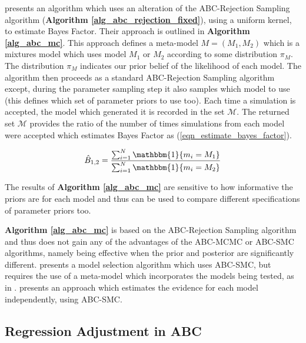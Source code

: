 \documentclass[11pt,a4paper]{article}
\theoremstyle{break}
\begin{document}
  \par \cite[]{abc_likelihood_free_methods_for_model_choice_in_gibbs_random_fields} presents an algorithm which uses an alteration of the ABC-Rejection Sampling algorithm (\textbf{Algorithm \ref{alg_abc_rejection_fixed}}), using a uniform kernel, to estimate Bayes Factor. Their approach is outlined in \textbf{Algorithm \ref{alg_abc_mc}}. This approach defines a meta-model $M=(M_1,M_2)$ which is a mixtures model which uses model $M_1$ or $M_2$ according to some distribution $\pi_M$. The distribution $\pi_M$ indicates our prior belief of the likelihood of each model. The algorithm then proceeds as a standard ABC-Rejection Sampling algorithm except, during the parameter sampling step it also samples which model to use (this defines which set of parameter priors to use too). Each time a simulation is accepted, the model which generated it is recorded in the set $\mathcal{M}$. The returned set $\mathcal{M}$ provides the ratio of the number of times simulations from each model were accepted which estimates Bayes Factor as (\ref{eqn_estimate_bayes_factor}).

  \begin{equation}\label{eqn_estimate_bayes_factor}
    \hat{B}_{1,2}=\frac{\sum_{i=1}^N\mathbbm{1}\{m_i=M_1\}}{\sum_{i=1}^N\mathbbm{1}\{m_i=M_2\}}
  \end{equation}

  \par The results of \textbf{Algorithm \ref{alg_abc_mc}} are sensitive to how informative the priors are for each model and thus can be used to compare different specifications of parameter priors too.

  \par \textbf{Algorithm \ref{alg_abc_mc}} is based on the ABC-Rejection Sampling algorithm and thus does not gain any of the advantages of the ABC-MCMC or ABC-SMC algorithms, namely being effective when the prior and posterior are significantly different. \cite[]{abc_scgene_for_parameter_inference_and_model_selection_in_dynamical_systems} presents a model selection algorithm which uses ABC-SMC, but requires the use of a meta-model which incorporates the models being tested, as in \cite[]{abc_likelihood_free_methods_for_model_choice_in_gibbs_random_fields}. \cite[]{likelihood_free_estimation_of_model_evidence} presents an approach which estimates the evidence for each model independently, using ABC-SMC.

\subsection{Regression Adjustment in ABC}\label{sec_abc_regression_adjustment}
\end{document}
